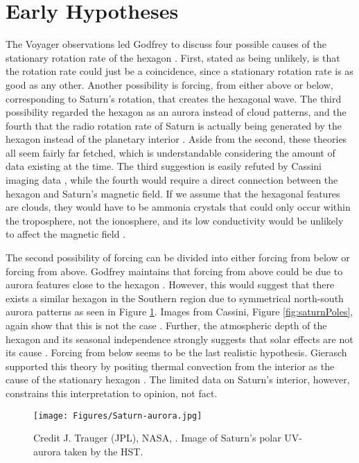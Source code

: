 \documentclass[preprint]{revtex4-1} %
\begin{document}
\section{Early Hypotheses}
\label{sec:earlyThry}
The Voyager observations led Godfrey to discuss four possible causes
of the stationary rotation rate of the hexagon \cite{Godfrey1988}.
First, stated as being unlikely, is that the rotation rate
could just be a coincidence, since a stationary rotation rate is as good 
as any other.  Another possibility is forcing, from either above or below,
corresponding to Saturn's rotation, that creates the hexagonal wave.
The third possibility regarded the hexagon as an aurora instead of
cloud patterns, and the fourth that the radio rotation rate of Saturn
is actually being generated by the hexagon instead of the planetary
interior \cite{Godfrey1988}.  Aside from the second, these theories
all seem fairly far fetched, which is understandable considering the
amount of data existing at the time.  The third suggestion is easily
refuted by Cassini imaging data \cite{Baines2009}, while the fourth
would require a direct connection between the hexagon and Saturn's
magnetic field.  If we assume that the hexagonal features are clouds,
they would have to be ammonia crystals that could only occur within
the troposphere, not the ionosphere, and its low conductivity would be unlikely to
affect the magnetic field \cite{Gierasch1989}.

The second possibility of forcing can be divided into either forcing
from below or forcing from above.  Godfrey maintains that forcing from
above could be due to aurora features close to the hexagon
\cite{Godfrey1988}. However, this would suggest that there
exists a similar hexagon in the Southern region due to symmetrical
north-south aurora patterns as seen in Figure
\ref{fig:saturnAurora}.   Images from Cassini, Figure \ref{fig:saturnPoles},
again show that this is not the case \cite{Fletcher2008}.  Further, the
atmospheric depth of the hexagon and its seasonal independence
strongly suggests that solar effects are not its cause \cite{Baines2009}.  Forcing
from below seems to be the last realistic hypothesis.  Gierasch
supported this theory by positing thermal convection from the interior as
the cause of the stationary hexagon \cite{Gierasch1989}.  The limited
data on Saturn's interior, however, constrains this interpretation to
opinion, not fact. 

\begin{figure}
  \centering
  \texttt{[image: Figures/Saturn-aurora.jpg]}
  \caption{Credit J. Trauger (JPL), NASA, \cite{APOD2001}.  Image of
    Saturn's polar UV-aurora taken by the HST.} 
  \label{fig:saturnAurora}
\end{figure}
\end{document}
